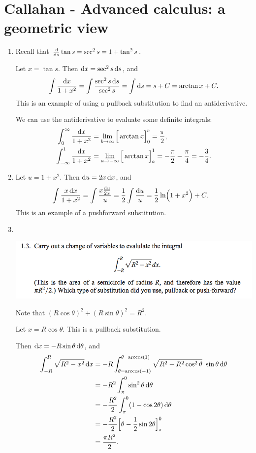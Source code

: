 \section{Callahan - Advanced calculus: a geometric view}


\begin{enumerate}
\item
  Recall that $\dds \tan s = \sec^2 s = 1 + \tan^2 s$.

  Let $x = \tan s$. Then $\dx = \sec^2 s \ds$, and
  \begin{align*}
      \int \frac{\dx}{1 + x^2}
    = \int \frac{\sec^2 s \ds}{\sec^2 s}
    = \int \ds
    = s + C
    = \arctan x + C.
  \end{align*}
  This is an example of using a pullback substitution to find an antiderivative.

  We can use the antiderivative to evaluate some definite integrals:
  \begin{align*}
      \int_0^\infty \frac{\dx}{1 + x^2}
    &= \lim_{b\to\infty}\Big[\arctan x\Big]_0^b
    = \frac{\pi}{2},\\
      \int_{-\infty}^1 \frac{\dx}{1 + x^2}
    &= \lim_{a\to-\infty}\Big[\arctan x\Big]_a^1
    = -\frac{\pi}{2} - \frac{\pi}{4} = -\frac{3}{4}.
  \end{align*}
\item
  Let $u = 1 + x^2$. Then $\du = 2x \dx$, and
  \begin{align*}
    \int \frac{x \dx}{1 + x^2}
    &= \int \frac{x \frac{\du}{2x}}{u}
     = \frac{1}{2} \int \frac{\du}{u}
     = \frac{1}{2} \ln(1 + x^2) + C.
  \end{align*}
  This is an example of a pushforward substitution.
\item~\\
  \newpage
  \begin{mdframed}
    \includegraphics[width=400pt]{img/calculus--callahan--advanced-calculus-1-3.png}
  \end{mdframed}
  Note that $(R\cos\theta)^2 + (R\sin\theta)^2 = R^2$.

  Let $x = R\cos\theta$. This is a pullback substitution.

  Then $\dx = -R\sin\theta\d\theta$, and
  \begin{align*}
            \int_{-R}^R\sqrt{R^2 - x^2}\dx
    &= -R   \int_{\theta=\arccos(-1)}^{\theta=\arccos(1)}\sqrt{R^2 - R^2\cos^2\theta}~\sin\theta\d\theta\\
    &= -R^2 \int_\pi^0\sin^2\theta\d\theta\\
    &= -\frac{R^2}{2} \int_\pi^0(1 - \cos 2\theta)\d\theta\\
    &= -\frac{R^2}{2} \Big[\theta - \frac{1}{2}\sin 2\theta\Big]_\pi^0\\
    &= \frac{\pi R^2}{2}.
  \end{align*}

\end{enumerate}
